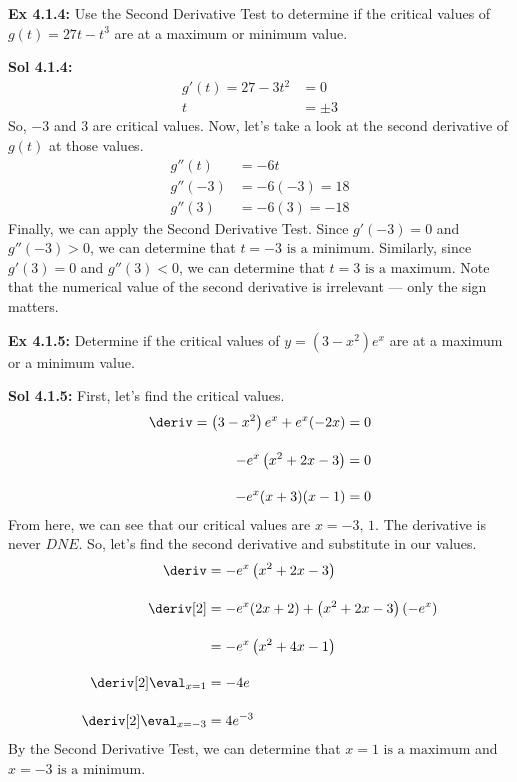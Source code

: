\begin{tcolorbox}[example]
    \textbf{Ex 4.1.4: } Use the Second Derivative Test to determine if the critical values of $g(t) = 27t - t^3$ are at a maximum or minimum value.
\end{tcolorbox} 
\begin{tcolorbox}[solution]
    \textbf{Sol 4.1.4: } \begin{align*}
        g'(t) = 27 - 3t^2 &= 0 \\[11pt]
        t &= \pm 3
    \end{align*}
    So, $-3$ and $3$ are critical values. Now, let's take a look at the second derivative of $g(t)$ at those values. \begin{align*}
        g''(t) &= -6t \\[11pt]
        g''(-3) &= -6(-3) = 18 \\[11pt]
        g''(3) &= -6(3) = -18
    \end{align*}
    Finally, we can apply the Second Derivative Test. Since $g'(-3) = 0$ and $g''(-3) > 0$, we can determine that $\boxed{t = -3 \text{ is a minimum}}$. Similarly, since $g'(3) = 0$ and $g''(3) < 0$, we can determine that $\boxed{t = 3 \text{ is a maximum}}$. Note that the numerical value of the second derivative is irrelevant --- only the sign matters.
\end{tcolorbox} \vspace{11pt}

\begin{tcolorbox}[example]
    \textbf{Ex 4.1.5: } Determine if the critical values of $y = \left(3 - x^2\right)e^x$ are at a maximum or a minimum value. 
\end{tcolorbox}
\begin{tcolorbox}[solution]
    \textbf{Sol 4.1.5: } First, let's find the critical values. \begin{align*}
        \deriv = \left(3 - x^2\right)e^x + e^x(-2x) &= 0 \\[11pt]
        -e^x\left(x^2 + 2x - 3\right) &= 0 \\[11pt]
        -e^x(x + 3)(x - 1) &= 0
    \end{align*}
    From here, we can see that our critical values are $x = -3, \, 1$. The derivative is never $DNE$. So, let's find the second derivative and substitute in our values. \begin{align*}
        \deriv &= -e^x\left(x^2 + 2x - 3\right) \\[11pt]
        \deriv[2] &= -e^x(2x + 2) + \left(x^2 + 2x - 3\right)\left(-e^x\right) \\[11pt]
        &= -e^x\left(x^2 + 4x - 1\right) \\[11pt]
        \deriv[2] \eval_{x = 1} &= -4e \\[11pt]
        \deriv[2] \eval_{x = -3} &= 4e^{-3}
    \end{align*}
    By the Second Derivative Test, we can determine that $\boxed{x = 1 \text{ is a maximum}}$ and $\boxed{x = -3 \text{ is a minimum}}$.
\end{tcolorbox}


